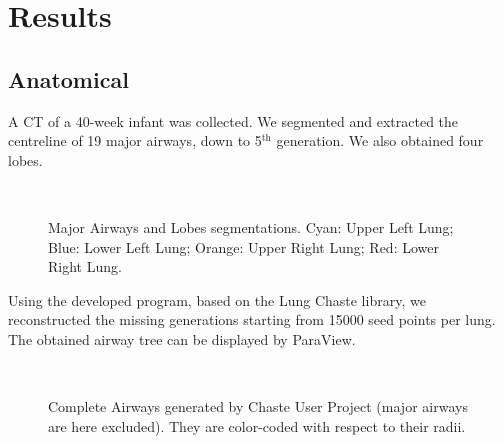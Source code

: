 \section{Results}
\label{sec:results}



\subsection{Anatomical}
\label{subsec:anatomical_results}


A CT of a 40-week infant was collected. We segmented and extracted the
centreline of 19 major airways, down to 5$^{\text{th}}$ generation.
We also obtained four lobes.


\begin{figure}[H]\centering
  \hspace{1cm}
  \\

  \caption{Major Airways and Lobes segmentations.  Cyan: Upper Left
    Lung; Blue: Lower Left Lung; Orange: Upper Right Lung; Red: Lower
    Right Lung.}
  \label{fig:anatomical_results}
\end{figure}

Using the developed program, based on the Lung Chaste library, we
reconstructed the missing generations starting from 15000 seed points
per lung.  The obtained airway tree can be displayed by ParaView.

\begin{figure}[H]\centering
  \hspace{1cm}
  \\

  \caption{Complete Airways generated by Chaste User Project (major
    airways are here excluded).  They are color-coded with respect to
    their radii.}
  \label{fig:complete_anatomical_results}
\end{figure}

